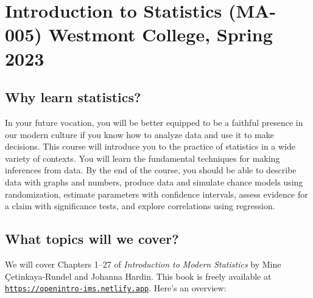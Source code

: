 \documentclass[
  twoside]{article}
\author{}
\date{\vspace{-2.5em}}
\begin{document}
\hypertarget{introduction-to-statistics-ma-005-westmont-college-spring-2023}{%
\section{Introduction to Statistics (MA-005) Westmont College, Spring
2023}\label{introduction-to-statistics-ma-005-westmont-college-spring-2023}}

\hypertarget{why-learn-statistics}{%
\subsection{Why learn statistics?}\label{why-learn-statistics}}

In your future vocation, you will be better equipped to be a faithful
presence in our modern culture if you know how to analyze data and use
it to make decisions. This course will introduce you to the practice of
statistics in a wide variety of contexts. You will learn the fundamental
techniques for making inferences from data. By the end of the course,
you should be able to describe data with graphs and numbers, produce
data and simulate chance models using randomization, estimate parameters
with confidence intervals, assess evidence for a claim with significance
tests, and explore correlations using regression.

\hypertarget{what-topics-will-we-cover}{%
\subsection{What topics will we
cover?}\label{what-topics-will-we-cover}}

We will cover Chapters 1--27 of \emph{Introduction to Modern Statistics}
by Mine Çetinkaya-Rundel and Johanna Hardin. This book is freely
available at
\href{https://openintro-ims.netlify.app/}{\texttt{https://openintro-ims.netlify.app}}.
Here's an overview:
\end{document}

